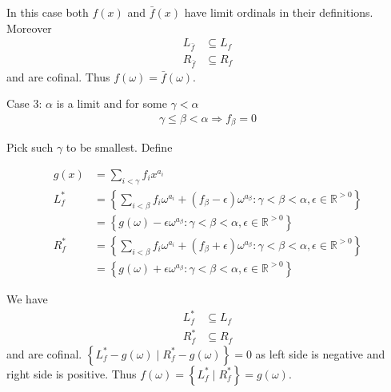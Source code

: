 \documentclass{article}
\newcommand{\curly}[1]{\left\{ #1 \right\}}
\newcommand{\R}{\mathbb{R}}
\newcommand{\w}{\omega}
\begin{document}
In this case both $f(x)$ and $\bar f(x)$ have limit ordinals in their definitions. Moreover 
\begin{align*}
	L_{\bar f} &\subseteq L_f \\
	R_{\bar f} &\subseteq R_f
\end{align*}
and are cofinal. Thus $f(\w) = \bar f(\w)$.

Case 3: $\alpha$ is a limit and for some $\gamma < \alpha$
\begin{align*}
	\gamma \leq \beta < \alpha \Rightarrow f_\beta = 0
\end{align*}

Pick such $\gamma$ to be smallest.
Define

\begin{align*}
	g(x) &= \sum_{i < \gamma} f_i x^{a_i} \\
  L_f^* &= \curly{\sum_{i < \beta} f_i \w^{a_i} + (f_\beta - \epsilon) \w^{a_\beta}
	\colon \gamma < \beta < \alpha, \epsilon \in \R^{>0}} \\
	&= \curly{g(\w) - \epsilon \w^{a_\beta}
	\colon \gamma < \beta < \alpha, \epsilon \in \R^{>0}} \\
  R_f^* &= \curly{\sum_{i < \beta} f_i \w^{a_i} + (f_\beta + \epsilon) \w^{a_\beta}
	\colon \gamma < \beta < \alpha, \epsilon \in \R^{>0}} \\
	&= \curly{g(\w) + \epsilon \w^{a_\beta}
	\colon \gamma < \beta < \alpha, \epsilon \in \R^{>0}}
\end{align*}

We have
\begin{align*}
	L_f^* &\subseteq L_f \\
	R_f^* &\subseteq R_f
\end{align*}
and are cofinal. $\curly{L_f^* - g(\w) \mid R_f^* - g(\w)} = 0$ as left side is negative and right side is positive.
Thus $f(\w) = \curly{L_f^* \mid R_f^*} = g(\w)$.
\end{document}
